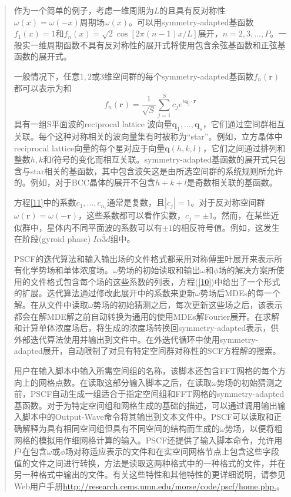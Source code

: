 \documentclass{article}
\begin{document}
\begin{CJK}{UTF8}{gkai}
\begin{quotation}
作为一个简单的例子，考虑一维周期为$L$的且具有反对称性$\omega(x)=\omega(-x)$周期场$\omega (x)$。可以用symmetry-adapted基函数$f_1(x)=1$和$f_n(x)=\sqrt{2}\cos\left[ 2\pi (n-1)x/L \right]$展开，$n=2,3,...,P$。一般实一维周期函数不具有反对称性的展开式将使用包含余弦基函数和正弦基函数的展开式。

一般情况下，任意$1,2$或$3$维空间群的每个symmetry-adapted基函数$f_n(\mathbf{r})$都可以表示为和
\begin{equation}\label{11}
f_n(\mathbf{r})=\frac{1}{\sqrt{S}}\sum_{j=1}^{S}c_je^{i\mathbf{q}_j\cdot \mathbf{r}}
\end{equation}
具有一组S平面波的reciprocal lattice 波向量$\mathbf{q}_1,...,\mathbf{q}_s$，它们通过空间群相互关联。每个这种对称相关的波向量集有时被称为“star”。例如，立方晶体中reciprocal lattice向量的每个星对应于向量$\mathbf{q}(h,k,l)$，它们之间通过排列和整数$h,k$和$l$符号的变化而相互关联。symmetry-adapted基函数的展开式只包含与star相关的基函数，其中包含波矢这是由所选空间群的系统规则所允许的。例如，对于BCC晶体的展开不包含$h+k+l$是奇数相关联的基函数。

方程\ref{11}中的系数$c_1,...,c_{n_s}$通常是复数，且$\left|c_j\right|=1$。对于反对称空间群$\omega(\mathbf{r})=\omega(\mathbf{-r})$，这些系数都可以看作实数，$c_j=\pm 1$。然而，在某些近似群中，星体内不同平面波的系数可以有$\pm 1$的相反符号值。例如，这发生在阶段(gyroid phase)的̅$I\alpha \bar{3} d$组中。

PSCF的迭代算法和输入输出场的文件格式都采用对称傅里叶展开来表示所有化学势场和单体浓度场。$\omega$势场的初始读取和输出$\omega$和$\phi$场的解决方案所使用的文件格式包含每个场的这些系数的列表，方程(\ref{10})中给出了一个形式的扩展。迭代算法通过修改此展开中的系数来更新$\omega$势场后MDEs的每一个解。在从文件中读取$\omega$势场的初始猜测之后，每次更新这些场之后，该表示都会在解MDE解之前自动转换为通用的使用MDEs解Fourier展开。在求解和计算单体浓度场后，将生成的浓度场转换回symmetry-adapted表示，供外部迭代算法使用并输出到文件中。在外迭代循环中使用symmetry-adapted展开，自动限制了对具有特定空间群对称性的SCF方程解的搜索。

用户在输入脚本中输入所需空间组的名称，该脚本还包含FFT网格的每个方向上的网格点数。在读取这部分输入脚本之后，在读取$\omega$势场的初始猜测之前，PSCF自动生成一组适合于指定空间组和FFT网格的symmetry-adapted基函数。对于为特定空间组和网格生成的基础的描述，可以通过调用输出输入脚本中的Output-Wave命令将其输出到文本文件中。PSCF可以读取和正确解释为具有相同空间组但具有不同空间的结构而生成的$\omega$势场，以便将粗网格的模拟用作细网格计算的输入。PSCF还提供了输入脚本命令，允许用户在包含$\omega$或$\phi$场对称适应表示的文件和在实空间网格节点上包含这些字段值的文件之间进行转换，方法是读取这两种格式中的一种格式的文件，并在另一种格式中输出的文件。有关这些特性和其他特性的更详细说明，请参见Web用户手册\url{http://research.cems.umn.edu/morse/code/pscf/home.php.}。


\end{quotation}
\end{CJK}
\end{document}
